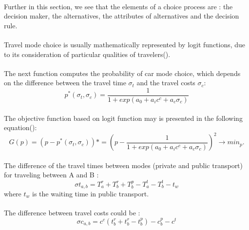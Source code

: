 \paragraph{}Further in this section, we see that the elements of a choice process are : the decision maker, the alternatives, the attributes of alternatives and the decision rule.
\paragraph{}Travel mode choice is usually mathematically represented by logit functions, due to its consideration of particular qualities of travelers(\cite{Bravo et al, 2009}).
\paragraph{}The next function computes the probability of car mode choice, which depends on the difference between the travel time $\sigma_t$ and the travel costs $\sigma_c$:
\begin{equation}
p^{*}(\sigma_t,\sigma_c) = \frac{1}{1+exp(a_0+ a_i c^c + a_c \sigma_c)}
\end{equation}
\paragraph{}The objective function based on logit function may is presented in the following equation(\cite{Hollander et al, 2006}):
\begin{equation}
G(p) = (p - p^{*}(\sigma_t,\sigma_c))*
	 = (p - \frac{1}{1+exp(a_0+ a_i c^c + a_c \sigma_c)})^2 \rightarrow min_p.
\end{equation}
\paragraph{}The difference of the travel times between modes (private
and public transport) for traveling between A and B :
\begin{equation}
\sigma t_{a,b} = T^{r}_a + T^{r}_b + T^{p}_b - T^{t}_a - T^{t}_b - t_w
\end{equation}
where $t_w$ is the waiting time in public transport.
\paragraph{}The difference between travel costs could be : 
\begin{equation}
\sigma c_{a,b} = c^{c} ( t^{r}_b + t^{r}_b - t^{p}_b )- c^{p}_b - c^t
\end{equation}
